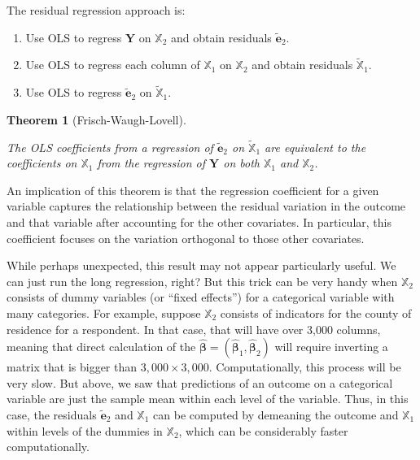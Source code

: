 \documentclass[
  13pt,
  letterpaper,
  DIV=11,
  numbers=noendperiod]{scrreprt}
\providecommand{\tightlist}{%
  \setlength{\itemsep}{0pt}\setlength{\parskip}{0pt}}\usepackage{longtable,booktabs,array}
\newcommand{\mb}{\symbf}
\newcommand{\Xmat}{\mathbb{X}}
\newcommand{\bhat}{\widehat{\mb{\beta}}}
\theoremstyle{definition}
\theoremstyle{definition}
\theoremstyle{plain}
\newtheorem{theorem}{Theorem}[chapter]
\theoremstyle{remark}
\begin{document}
\begin{tcolorbox}[enhanced jigsaw, leftrule=.75mm, colbacktitle=quarto-callout-note-color!10!white, title=\textcolor{quarto-callout-note-color}{\faInfo}\hspace{0.5em}{Residual regression approach}, toptitle=1mm, breakable, left=2mm, toprule=.15mm, arc=.35mm, opacitybacktitle=0.6, opacityback=0, colback=white, rightrule=.15mm, titlerule=0mm, colframe=quarto-callout-note-color-frame, bottomtitle=1mm, bottomrule=.15mm, coltitle=black]

The residual regression approach is:

\begin{enumerate}
\def\labelenumi{\arabic{enumi}.}
\tightlist
\item
  Use OLS to regress \(\mb{Y}\) on \(\Xmat_2\) and obtain residuals
  \(\widetilde{\mb{e}}_2\).
\item
  Use OLS to regress each column of \(\Xmat_1\) on \(\Xmat_2\) and
  obtain residuals \(\widetilde{\Xmat}_1\).
\item
  Use OLS to regress \(\widetilde{\mb{e}}_{2}\) on
  \(\widetilde{\Xmat}_1\).
\end{enumerate}

\end{tcolorbox}

\begin{theorem}[Frisch-Waugh-Lovell]\protect\hypertarget{thm-fwl}{}\label{thm-fwl}

The OLS coefficients from a regression of \(\widetilde{\mb{e}}_{2}\) on
\(\widetilde{\Xmat}_1\) are equivalent to the coefficients on
\(\Xmat_{1}\) from the regression of \(\mb{Y}\) on both \(\Xmat_{1}\)
and \(\Xmat_2\).

\end{theorem}

An implication of this theorem is that the regression coefficient for a
given variable captures the relationship between the residual variation
in the outcome and that variable after accounting for the other
covariates. In particular, this coefficient focuses on the variation
orthogonal to those other covariates.

While perhaps unexpected, this result may not appear particularly
useful. We can just run the long regression, right? But this trick can
be very handy when \(\Xmat_2\) consists of dummy variables (or ``fixed
effects'') for a categorical variable with many categories. For example,
suppose \(\Xmat_2\) consists of indicators for the county of residence
for a respondent. In that case, that will have over 3,000 columns,
meaning that direct calculation of the
\(\bhat = (\bhat_{1}, \bhat_{2})\) will require inverting a matrix that
is bigger than \(3,000 \times 3,000\). Computationally, this process
will be very slow. But above, we saw that predictions of an outcome on a
categorical variable are just the sample mean within each level of the
variable. Thus, in this case, the residuals \(\widetilde{\mb{e}}_2\) and
\(\Xmat_1\) can be computed by demeaning the outcome and \(\Xmat_1\)
within levels of the dummies in \(\Xmat_2\), which can be considerably
faster computationally.
\end{document}
